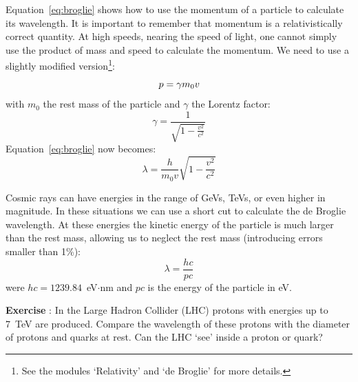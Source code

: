\documentclass[12pt,a4paper]{article}
\numberwithin{equation}{section}
\numberwithin{figure}{section}
\newcounter{Exercise}
\numberwithin{table}{section}
\begin{document}
Equation~\ref{eq:broglie} shows how to use the momentum of a particle to calculate its wavelength. It is important to remember that momentum is a relativistically correct quantity. At high speeds, nearing the speed of light, one cannot simply use the product of mass and speed to calculate the momentum. We need to use a slightly modified version\footnote{See the modules `Relativity' and `de Broglie' for more details.}:
\begin{equation}
p = \gamma m_0 v \\
\end{equation}
with $m_0$ the rest mass of the particle and $\gamma$ the Lorentz factor:
\begin{equation}
\gamma = \frac{1}{\sqrt{1-\frac{v^2}{c^2}}}
\end{equation}
Equation~\ref{eq:broglie} now becomes:
\begin{equation}
\lambda = \frac{h}{m_0 v} \sqrt{1-\frac{v^2}{c^2}} \label{eq:broglie_rel}
\end{equation}

Cosmic rays can have energies in the range of GeVs, TeVs, or even higher in magnitude. In these situations we can use a short cut to calculate the de Broglie wavelength. At these energies the kinetic energy of the particle is much larger than the rest mass, allowing us to neglect the rest mass (introducing errors smaller than 1\%):
\begin{equation}
\lambda = \frac{hc}{pc}
\end{equation}
were $hc = 1239.84$~eV$\cdot$nm and $pc$ is the energy of the particle in eV.

\begin{shaded}
\textbf{Exercise \theExercise {}} : In the Large Hadron Collider (LHC) protons with energies up to 7~TeV are produced. Compare the wavelength of these protons with the diameter of protons and quarks at rest. Can the LHC `see' inside a proton or quark?\end{shaded}
\end{document}
